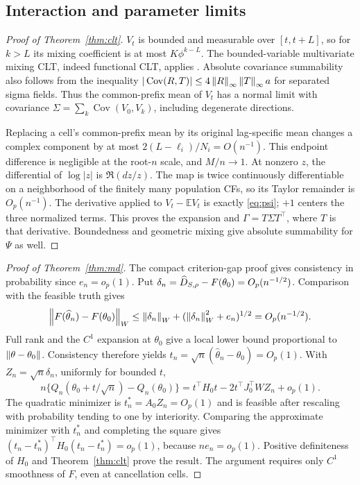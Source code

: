\documentclass[11pt,a4paper]{article}
\theoremstyle{remark}\newtheorem{remark}[theorem]{Remark}
\newcommand{\E}{\mathbb E}\newcommand{\Pp}{\mathbb P}
\DeclareMathOperator{\Cov}{Cov}\DeclareMathOperator{\Var}{Var}
\begin{document}
\subsection{Interaction and parameter limits}\label{proof:limits}
\begin{proof}[Proof of Theorem~\ref{thm:clt}]
$V_t$ is bounded and measurable over $[t,t+L]$, so for $k>L$ its mixing coefficient is at most $K\phi^{k-L}$. The bounded-variable multivariate mixing CLT, indeed functional CLT, applies \cite{dmr}. Absolute covariance summability also follows from the inequality
$|\Cov(R,T)|\le4\norm{R}_\infty\norm{T}_\infty a$ for separated sigma fields. Thus the common-prefix mean of $V_t$ has a normal limit with covariance $\Sigma=\sum_k\Cov(V_0,V_k)$, including degenerate directions.

Replacing a cell's common-prefix mean by its original lag-specific mean changes a complex component by at most $2(L-\ell_i)/N_i=O(n^{-1})$. This endpoint difference is negligible at the root-$n$ scale, and $M/n\to1$.
At nonzero $z$, the differential of $\log|z|$ is $\Re(dz/z)$. The map is twice continuously differentiable on a neighborhood of the finitely many population CFs, so its Taylor remainder is $O_p(n^{-1})$. The derivative applied to $V_t-\E V_t$ is exactly \eqref{eq:psi}; $+1$ centers the three normalized terms. This proves the expansion and $\Gamma=T\Sigma T^\top$, where $T$ is that derivative. Boundedness and geometric mixing give absolute summability for $\Psi$ as well.
\end{proof}

\begin{proof}[Proof of Theorem~\ref{thm:md}]
The compact criterion-gap proof gives consistency in probability since $e_n=o_p(1)$. Put $\delta_n=\widehat D_{S,\rho}-F(\theta_0)=O_p(n^{-1/2})$. Comparison with the feasible truth gives
\[
\left\lVert F(\widehat\theta_n)-F(\theta_0)\right\rVert_W
\le\left\lVert\delta_n\right\rVert_W+(\left\lVert\delta_n\right\rVert_W^2+e_n)^{1/2}
=O_p(n^{-1/2}).
\]
Full rank and the $C^1$ expansion at $\theta_0$ give a local lower bound proportional to $\left\lVert\theta-\theta_0\right\rVert$. Consistency therefore yields
$t_n=\sqrt n(\widehat\theta_n-\theta_0)=O_p(1)$.
With $Z_n=\sqrt n\delta_n$, uniformly for bounded $t$,
\[
n\{Q_n(\theta_0+t/\sqrt n)-Q_n(\theta_0)\}
=t^\top H_0t-2t^\top J_0^\top WZ_n+o_p(1).
\]
The quadratic minimizer is $t_n^*=A_0Z_n=O_p(1)$ and is feasible after rescaling with probability tending to one by interiority. Comparing the approximate minimizer with $t_n^*$ and completing the square gives
$(t_n-t_n^*)^\top H_0(t_n-t_n^*)=o_p(1)$, because $ne_n=o_p(1)$. Positive definiteness of $H_0$ and Theorem~\ref{thm:clt} prove the result. The argument requires only $C^1$ smoothness of $F$, even at cancellation cells.
\end{proof}
\end{document}
